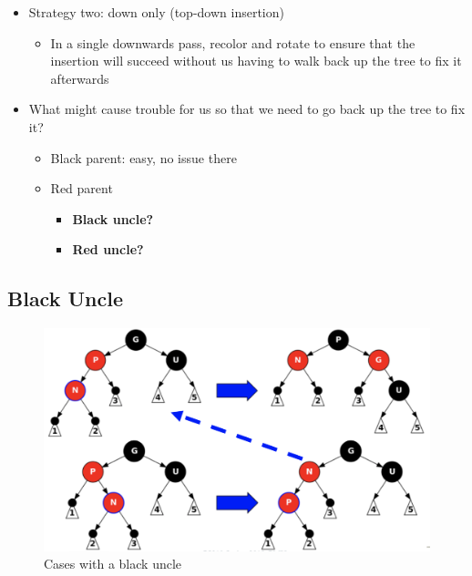 \documentclass[
  10pt,
  english,
  letterpaper,
,tablecaptionabove
]{scrartcl}
\providecommand{\tightlist}{%
  \setlength{\itemsep}{0pt}\setlength{\parskip}{0pt}}
\begin{document}
\begin{itemize}
\tightlist
\item
  Strategy two: down only (top-down insertion)

  \begin{itemize}
  \tightlist
  \item
    In a single downwards pass, recolor and rotate to ensure that the
    insertion will succeed without us having to walk back up the tree to
    fix it afterwards
  \end{itemize}
\item
  What might cause trouble for us so that we need to go back up the tree
  to fix it?

  \begin{itemize}
  \tightlist
  \item
    Black parent: easy, no issue there
  \item
    Red parent

    \begin{itemize}
    \tightlist
    \item
      \textbf{Black uncle?}
    \item
      \textbf{Red uncle?}
    \end{itemize}
  \end{itemize}
\end{itemize}

\hypertarget{black-uncle}{%
\subsection{Black Uncle}\label{black-uncle}}

\begin{figure}
\centering
\includegraphics[width=1\textwidth,height=\textheight]{images/5.png}
\caption{Cases with a black uncle}
\end{figure}
\end{document}
